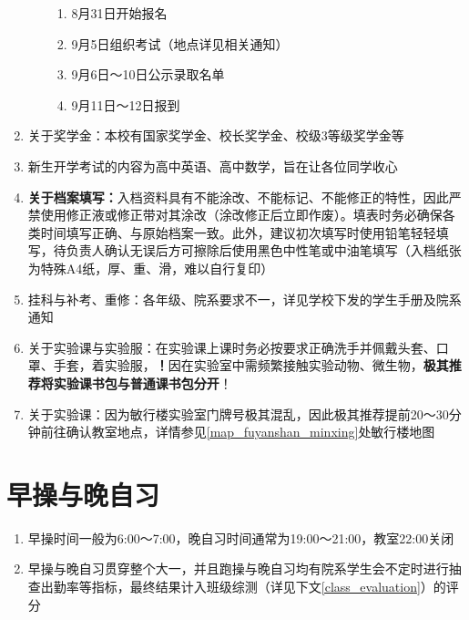 \begin{enumerate}
\begin{enumerate}
\begin{enumerate}
                        \item 8月31日开始报名
                        \item 9月5日组织考试（地点详见相关通知）
                        \item 9月6日～10日公示录取名单\footnotemark
                        \item 9月11日～12日报到
                    \end{enumerate}
          \end{enumerate}
    \item 关于奖学金\footnotemark：本校有国家奖学金、校长奖学金、校级3等级奖学金等
    \item 新生开学考试\footnotemark 的内容为高中英语、高中数学，旨在让各位同学收心
    \item \textbf{关于档案填写：}入档资料具有不能涂改、不能标记、不能修正的特性，因此严禁使用修正液或修正带对其涂改（涂改修正后立即作废）。填表时务必确保各类时间填写正确、与原始档案一致。此外，建议初次填写时使用铅笔轻轻填写，待负责人确认无误后方可擦除后使用黑色中性笔或中油笔填写（入档纸张为特殊A4纸，厚、重、滑，难以自行复印）
    \item 挂科与补考、重修：各年级、院系要求不一，详见学校下发的学生手册及院系通知
    \item 关于实验课与实验服：在实验课上课时务必按要求正确洗手并佩戴头套、口罩、手套，着实验服，\textbf{！}因在实验室中需频繁接触实验动物、微生物，\textbf{极其推荐将实验课书包与普通课书包分开}！
          \label{schoolbag}
    \item 关于实验课：因为敏行楼实验室门牌号极其混乱，因此极其推荐提前20～30分钟前往确认教室地点，详情参见\uline{\ref{map_fuyanshan_minxing}}处敏行楼地图
\end{enumerate}

\section[早操与晚自习]{早操与晚自习}
\begin{enumerate}
    \item 早操时间一般为6:00～7:00，晚自习时间通常为19:00～21:00，教室22:00关闭
    \item 早操与晚自习贯穿整个大一\footnotemark，并且跑操与晚自习均有院系学生会不定时进行抽查出勤率等指标，最终结果计入班级综测（详见下文\uline{\ref{class_evaluation}}）的评分
\end{enumerate}

